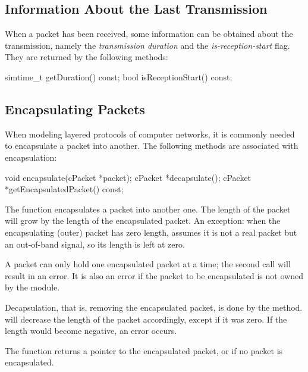 \subsection{Information About the Last Transmission}
\label{sec:messages:information-about-last-transmission}

When a packet has been received, some information can be obtained
about the transmission, namely the \textit{transmission duration}
and the \textit{is-reception-start} flag. They are returned by
the following methods:

\begin{cpp}
simtime_t getDuration() const;
bool isReceptionStart() const;
\end{cpp}


\subsection{Encapsulating Packets}
\label{sec:messages:encapsulating-packets}

When modeling layered protocols of computer networks, it is commonly
needed to encapsulate a packet into another.
The following  methods are associated with encapsulation:

\begin{cpp}
void encapsulate(cPacket *packet);
cPacket *decapsulate();
cPacket *getEncapsulatedPacket() const;
\end{cpp}

The  function encapsulates a packet into another one.
The length of the packet will grow by the length of the encapsulated
packet. An exception: when the encapsulating (outer) packet has zero
length, {\opp} assumes it is not a real packet but an out-of-band signal,
so its length is left at zero.

A packet can only hold one encapsulated packet at a time; the second
 call will result in an error. It is also an error if
the packet to be encapsulated is not owned by the module.

Decapsulation, that is, removing the encapsulated packet, is done by the
 method.  will decrease the
length of the packet accordingly, except if it was zero. If the length
would become negative, an error occurs.

The  function returns a pointer to the
encapsulated packet, or  if no packet is encapsulated.

